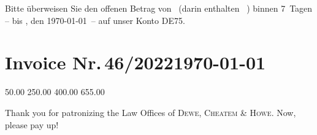 \documentclass[12pt]{scrartcl}		%
\begin{document}
\def\payperiod{7}					%

Bitte überweisen Sie den offenen Betrag von 
\Total\ (darin enthalten \TaxAmnt ~\TaxAbrv) 
binnen \payperiod~Tagen – bis \DayName{\year}{\month}{\day+\payperiod}, 
den \AdvanceDate[\payperiod]\today\ – 
auf unser Konto DE75.

\AdvanceDate[-\payperiod]		%


\section*{Invoice Nr.\,46/2022\hfill\today}

\makeatletter
	\renewcommand*\@running		{Nr.}				%
	\renewcommand*\@amount		{Amount}			%
	\renewcommand*\@itemnr		{~}					%
	\renewcommand*\@description	{Description}		%
	\renewcommand*\@unitprice	{Base Fee}			%
	\renewcommand*\@totalprice	{Total}				%
	\renewcommand*\@decimalsep	{.}					%
\makeatother

\UseDollar
	\begin{invoice*}[B]				%
		\NumbersOff					%
		\SeparatorOff				%
					{50.00}
				{250.00}
			{400.00}
			{655.00}
	\end{invoice*}

\def\payperiod{14}					%
\enlargethispage{2\baselineskip}

Thank you for patronizing the Law Offices of \textsc{Dewe, Cheatem \& Howe}. Now, please pay up!
\end{document}
